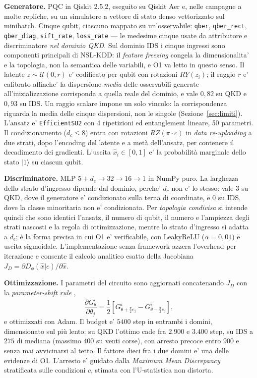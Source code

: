 \documentclass[10pt,conference,a4paper,twocolumn]{IEEEtran}
\begin{document}
\textbf{Generatore.} PQC in Qiskit 2.5.2, eseguito su Qiskit Aer e, nelle campagne a molte repliche, su un simulatore a vettore di stato denso vettorizzato sul minibatch. Cinque qubit, ciascuno mappato su un'osservabile: \texttt{qber}, \texttt{qber\_rect}, \texttt{qber\_diag}, \texttt{sift\_rate}, \texttt{loss\_rate} — le medesime cinque usate da attributore e discriminatore \emph{nel dominio QKD}. Sul dominio IDS i cinque ingressi sono componenti principali di NSL-KDD: il \textit{feature freezing} congela la dimensionalita' e la topologia, non la semantica delle variabili, e O1 va letto in questo senso. Il latente $z \sim \mathcal{U}(0, r)$ e' codificato per qubit con rotazioni $RY(z_i)$; il raggio $r$ e' calibrato affinche' la dispersione \emph{media} delle osservabili generate all'inizializzazione corrisponda a quella reale del dominio, e vale $0{,}82$ su QKD e $0{,}93$ su IDS. Un raggio scalare impone un solo vincolo: la corrispondenza riguarda la media delle cinque dispersioni, non le singole (Sezione~\ref{sec:limiti}). L'ansatz e' \texttt{EfficientSU2} con 4 ripetizioni ed entanglement lineare, 50 parametri. Il condizionamento ($d_c \le 8$) entra con rotazioni $RZ(\pi \cdot c)$ in \textit{data re-uploading} a due strati, dopo l'encoding del latente e a metà dell'ansatz, per contenere il decadimento dei gradienti. L'uscita $\hat{x}_i \in [0,1]$ e' la probabilità marginale dello stato $|1\rangle$ su ciascun qubit.

\textbf{Discriminatore.} MLP $5 + d_c \rightarrow 32 \rightarrow 16 \rightarrow 1$ in NumPy puro. La larghezza dello strato d'ingresso dipende dal dominio, perche' $d_c$ non e' lo stesso: vale $3$ su QKD, dove il generatore e' condizionato sulla terna di coordinate, e $0$ su IDS, dove la classe minoritaria non e' condizionata. Per \emph{topologia condivisa} si intende quindi che sono identici l'ansatz, il numero di qubit, il numero e l'ampiezza degli strati nascosti e la regola di ottimizzazione, mentre lo strato d'ingresso si adatta a $d_c$; è la forma precisa in cui O1 e' verificabile, con LeakyReLU ($\alpha = 0{,}01$) e uscita sigmoidale. L'implementazione senza framework azzera l'overhead per iterazione e consente il calcolo analitico esatto della Jacobiana $J_D = \partial D_\phi(\hat{x}|c) / \partial \hat{x}$.

\textbf{Ottimizzazione.} I parametri del circuito sono aggiornati concatenando $J_D$ con la \textit{parameter-shift rule} \cite{circuit_learning,parameter_shift},
\begin{equation}
    \frac{\partial G_\theta^i}{\partial \theta_j} = \frac{1}{2} \left[ G_{\theta + \frac{\pi}{2} e_j}^i - G_{\theta - \frac{\pi}{2} e_j}^i \right],
\end{equation}
e ottimizzati con Adam. Il budget e' $5400$ step in entrambi i domini, dimensionato sul più lento: su QKD l'ottimo cade fra $2.900$ e $3.400$ step, su IDS a $275$ di mediana (massimo $400$ su venti corse), con arresto precoce entro $900$ e senza mai avvicinarsi al tetto. Il fattore dieci fra i due domini e' una delle evidenze di O1. L'arresto e' guidato dalla \textit{Maximum Mean Discrepancy} \cite{mmd} stratificata sulle condizioni $c$, stimata con l'U-statistica non distorta.
\end{document}
